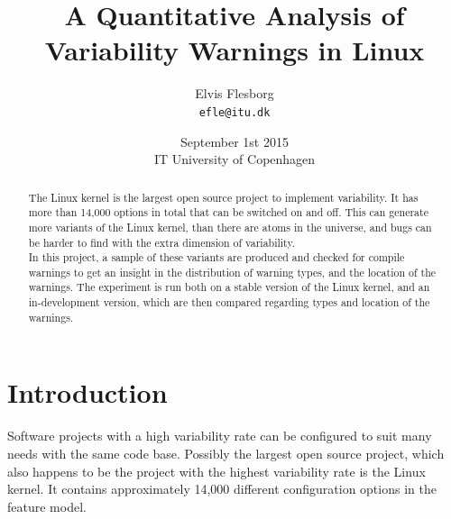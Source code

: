 \documentclass[a4paper,11pt]{report}
\begin{document}
\setlength{\parindent}{0cm}
\setlength{\unitlength}{1mm}

\date{September 1st 2015\\ IT University of Copenhagen}
\title{A Quantitative Analysis of Variability Warnings in Linux}
\author{Elvis Flesborg\\
\texttt{efle@itu.dk}}
\clearpage\maketitle
\thispagestyle{empty}
\newpage

\tableofcontents
\thispagestyle{empty}



\newpage

\setcounter{page}{1}


            \begin{abstract}

The Linux kernel is the largest open source project to implement variability. It
has more than 14,000 options in total that can be switched on and off. This can 
generate more variants of the Linux kernel, than there are atoms in the 
universe, and bugs can be harder to find with the extra dimension of 
variability.
\\

In this project, a sample of these variants are produced and checked for compile
warnings to get an insight in the distribution of warning types, and the 
location of the warnings. The experiment is run both on a stable version of the 
Linux kernel, and an in-development version, which are then compared regarding 
types and location of the warnings.



            \end{abstract}


\chapter{Introduction}
Software projects with a high variability rate can be configured to suit many
needs with the same code base. Possibly the largest open source project, which 
also happens to be the project with the highest variability rate
is the Linux kernel. It contains approximately 14,000 different configuration 
options in the feature model.
\\
\end{document}
